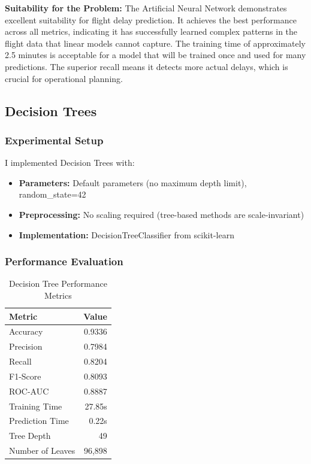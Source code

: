 \documentclass[sigconf]{acmart}
\begin{document}
\textbf{Suitability for the Problem:} The Artificial Neural Network demonstrates excellent suitability for flight delay prediction. It achieves the best performance across all metrics, indicating it has successfully learned complex patterns in the flight data that linear models cannot capture. The training time of approximately 2.5 minutes is acceptable for a model that will be trained once and used for many predictions. The superior recall means it detects more actual delays, which is crucial for operational planning.

\subsection{Decision Trees}

\subsubsection{Experimental Setup}
I implemented Decision Trees with:
\begin{itemize}
    \item \textbf{Parameters:} Default parameters (no maximum depth limit), random\_state=42
    \item \textbf{Preprocessing:} No scaling required (tree-based methods are scale-invariant)
    \item \textbf{Implementation:} DecisionTreeClassifier from scikit-learn
\end{itemize}

\subsubsection{Performance Evaluation}
\begin{table}[h]
\centering
\caption{Decision Tree Performance Metrics}
\begin{tabular}{lr}
\toprule
Metric & Value \\
\midrule
Accuracy & 0.9336 \\
Precision & 0.7984 \\
Recall & 0.8204 \\
F1-Score & 0.8093 \\
ROC-AUC & 0.8887 \\
Training Time & 27.85s \\
Prediction Time & 0.22s \\
Tree Depth & 49 \\
Number of Leaves & 96,898 \\
\bottomrule
\end{tabular}
\end{table}
\end{document}
